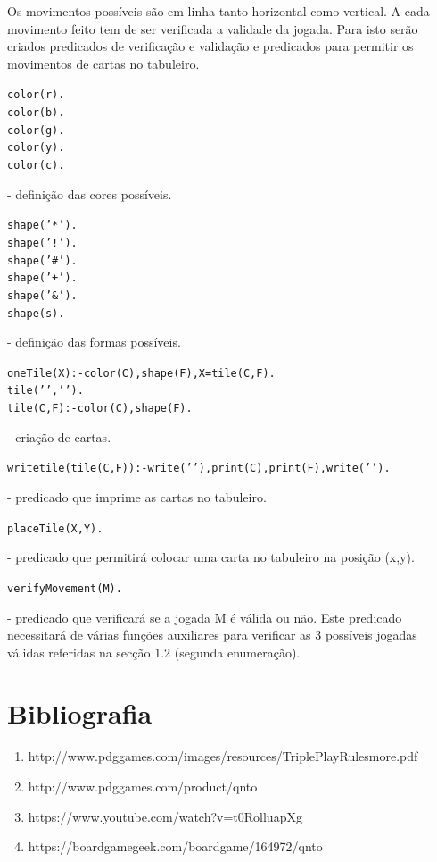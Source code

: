 \documentclass[a4paper]{article}
\begin{document}
Os movimentos possíveis são em linha tanto horizontal como vertical. A cada movimento feito tem de ser verificada a validade da jogada. Para isto serão criados predicados de verificação e validação e predicados para permitir os movimentos de cartas no tabuleiro. 

\begin{alltt}
	color(r). 
	color(b).
	color(g).
	color(y).
	color(c).
\end{alltt}
		\normalfont - definição das cores possíveis.
\begin{alltt}
	shape('*').
	shape('!').
	shape('#').
	shape('+').
	shape('&').
	shape(s).
\end{alltt}
		\normalfont - definição das formas possíveis.
\begin{alltt}
	oneTile(X) :- color(C), shape(F), X = tile(C,F).
	tile(' ',' ').
	tile(C, F) :- color(C), shape(F).
\end{alltt}
		\normalfont - criação de cartas. 
\begin{alltt}
	writetile(tile(C,F)) :- write(' '), print(C), print(F), write(' ').
\end{alltt}
		\normalfont - predicado que imprime as cartas no tabuleiro.

\begin{alltt}
	placeTile(X,Y).
\end{alltt}
		\normalfont - predicado que permitirá colocar uma carta no tabuleiro na posição (x,y).
\begin{alltt}
	verifyMovement(M).
\end{alltt}
		\normalfont - predicado que verificará se a jogada M é válida ou não. Este predicado necessitará de várias funções auxiliares para verificar as 3 possíveis jogadas válidas referidas na secção 1.2 (segunda enumeração).

\section{Bibliografia}

\begin{enumerate}
	\item http://www.pdggames.com/images/resources/TriplePlayRulesmore.pdf
	\item http://www.pdggames.com/product/qnto
	\item https://www.youtube.com/watch?v=t0RolluapXg
	\item https://boardgamegeek.com/boardgame/164972/qnto
\end{enumerate}
\end{document}
